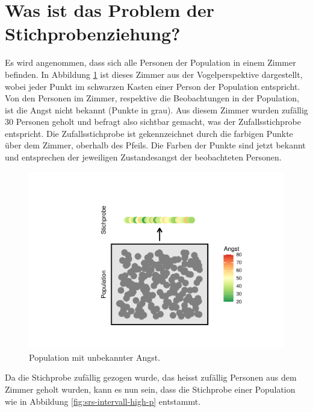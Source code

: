 \documentclass[
]{book}
\theoremstyle{definition}
\theoremstyle{definition}
\theoremstyle{definition}
\theoremstyle{definition}
\theoremstyle{remark}
\begin{document}
\section{Was ist das Problem der Stichprobenziehung?}\label{stichprobenziehung-problem}

Es wird angenommen, dass sich alle Personen der Population in einem Zimmer befinden. In Abbildung \ref{fig:srs-intervall-nocol} ist dieses Zimmer aus der Vogelperspektive dargestellt, wobei jeder Punkt im schwarzen Kasten einer Person der Population entspricht. Von den Personen im Zimmer, respektive die Beobachtungen in der Population, ist die Angst nicht bekannt (Punkte in grau). Aus diesem Zimmer wurden zufällig 30 Personen geholt und befragt also sichtbar gemacht, was der Zufallsstichprobe entspricht. Die Zufallsstichprobe ist gekennzeichnet durch die farbigen Punkte über dem Zimmer, oberhalb des Pfeils. Die Farben der Punkte sind jetzt bekannt und entsprechen der jeweiligen Zustandesangst der beobachteten Personen.

\begin{figure}
\centering
\includegraphics{aps_statistik1_files/figure-latex/srs-intervall-nocol-1.pdf}
\caption{\label{fig:srs-intervall-nocol}Population mit unbekannter Angst.}
\end{figure}

Da die Stichprobe zufällig gezogen wurde, das heisst zufällig Personen aus dem Zimmer geholt wurden, kann es nun sein, dass die Stichprobe einer Population wie in Abbildung \ref{fig:srs-intervall-high-p} entstammt.
\end{document}
